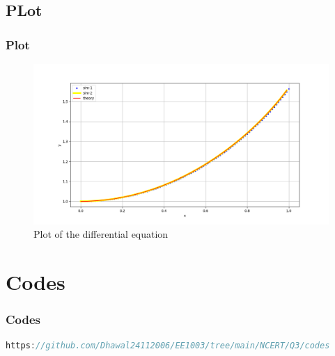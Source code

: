 \documentclass{beamer}
\theoremstyle{remark}
\numberwithin{equation}{section}
\begin{document}
\subsection{PLot}
\begin{frame}[fragile]
\frametitle{Plot}

\begin{figure}[h]
    \centering
    \includegraphics[width=\columnwidth]{figs/Figure_1.png}
    \caption{Plot of the differential equation }
    \label{fig:Plot}
    \end{figure}
\end{frame}

\section{Codes}
\begin{frame}[fragile]
\frametitle{Codes}
\begin{lstlisting}[language=C]
https://github.com/Dhawal24112006/EE1003/tree/main/NCERT/Q3/codes
    \end{lstlisting}
\end{frame}
\end{document}
